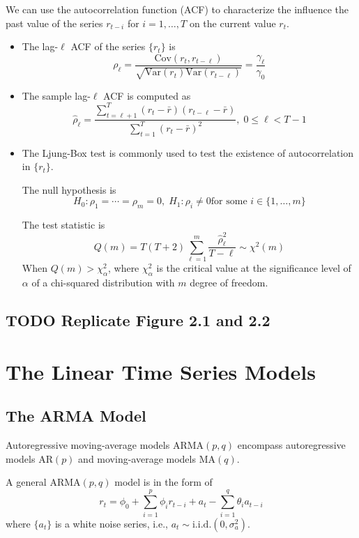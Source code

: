 \documentclass[a4paper,11pt]{article}
\newcommand{\var}{\mathrm{Var}}
\newcommand{\cov}{\mathrm{Cov}}
\begin{document}
We can use the autocorrelation function (ACF) to characterize the influence
the past value of the series \(r_{t-i}\) for \(i = 1, \ldots, T\) on the
current value \(r_t\). 

\begin{itemize}
\item The lag-\(\ell\) ACF of the series \(\{r_t\}\) is
\[ \rho_{\ell} = \frac{\cov(r_t, r_{t-\ell})}{\sqrt{\var(r_t)\var(r_{t-\ell})}} = \frac{\gamma_{\ell}}{\gamma_0} \]

\item The sample lag-\(\ell\) ACF is computed as 
\[ \hat{\rho}_{\ell} = \frac{\sum_{t=\ell+1}^T (r_t -
  \bar{r})(r_{t-\ell} - \bar{r})}{\sum_{t=1}^T (r_t - \bar{r})^2},\; 0
  \leq \ell < T-1 \]

\item The Ljung-Box test is commonly used to test the existence of
autocorrelation in \(\{r_t\}\). 

The null hypothesis is 
\[ H_0: \rho_1 = \cdots = \rho_m = 0,\; H_1: \rho_i \neq 0 \text{
  for some } i \in \{1, \ldots, m\} \]

The test statistic is 
\[ Q(m) = T(T+2)\sum_{\ell=1}^m \frac{\hat{\rho}^2_{\ell}}{T-\ell}
  \sim \chi^2(m) \]
When \(Q(m) > \chi^2_{\alpha}\), where \(\chi^2_{\alpha}\) is the
critical value at the significance level of \(\alpha\) of a
chi-squared distribution with \(m\) degree of freedom.
\end{itemize}

\subsection{{\bfseries\sffamily TODO} Replicate Figure 2.1 and 2.2}
\label{sec:org798fe60}


\section{The Linear Time Series Models}
\label{sec:orgc696503}

\subsection{The ARMA Model}
\label{sec:orgdcdbf2c}

Autoregressive moving-average models \(\mathrm{ARMA}(p, q)\)
encompass autoregressive models \(\mathrm{AR}(p)\) and
moving-average models \(\mathrm{MA}(q)\). 

A general \(\mathrm{ARMA}(p, q)\) model is in the form of
\begin{equation}
\label{eq:armapq}
r_t = \phi_0 + \sum_{i=1}^p \phi_i r_{t-i} + a_t - \sum_{i=1}^q \theta_i a_{t-i}
\end{equation}
where \(\{a_t\}\) is a white noise series, i.e., \(a_t \sim
\mathrm{i.i.d.}(0, \sigma^2_a)\). 
\end{document}
